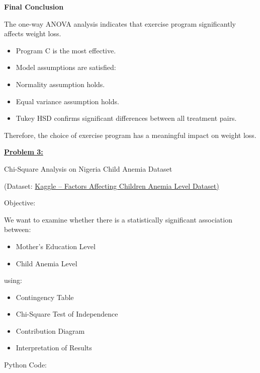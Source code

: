 \documentclass[
]{article}
\begin{document}
\textbf{Final Conclusion}

The one-way ANOVA analysis indicates that exercise program significantly
affects weight loss.

\begin{itemize}
\item
  Program C is the most effective.
\item
  Model assumptions are satisfied:
\item
  Normality assumption holds.
\item
  Equal variance assumption holds.
\item
  Tukey HSD confirms significant differences between all treatment
  pairs.
\end{itemize}

Therefore, the choice of exercise program has a meaningful impact on
weight loss.

\textbf{\ul{Problem 3:}}

Chi-Square Analysis on Nigeria Child Anemia Dataset

(Dataset: \ul{Kaggle -- Factors Affecting Children Anemia Level
Dataset)}

Objective:

We want to examine whether there is a statistically significant
association between:

\begin{itemize}
\item
  Mother's Education Level
\item
  Child Anemia Level
\end{itemize}

using:

\begin{itemize}
\item
  Contingency Table
\item
  Chi-Square Test of Independence
\item
  Contribution Diagram
\item
  Interpretation of Results
\end{itemize}

Python Code:
\end{document}
